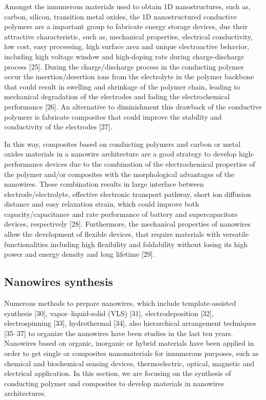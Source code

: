 Amongst the innumerous materials used to obtain 1D nanostructures, such as, carbon, silicon, transition metal oxides, the 1D nanostructured conductive polymers are a important group to fabricate energy storage devices, due their attractive characteristic, such as, mechanical properties, electrical conductivity, low cost, easy processing, high surface area and unique electroactive behavior, including high voltage window and high-doping rate during charge-discharge process [25]. During the charge/discharge process in the conducting polymer occur the insertion/desertion ions from the electrolyte in the polymer backbone that could result in swelling and shrinkage of the polymer chain, leading to mechanical degradation of the electrodes and fading the electrochemical performance [26]. An alternative to diminishment this drawback of the conductive polymers is fabricate composites that could improve the stability and conductivity of the electrodes [27].

In this way, composites based on conducting polymers and carbon or metal oxides materials in a nanowire architecture are a good strategy to develop high-performance devices due to the combination of the electrochemical properties of the polymer and/or composites with the morphological advantages of the nanowires. These combination results in large interface between electrode/electrolyte, effective electronic transport pathway, short ion diffusion distance and easy relaxation strain, which could improve both capacity/capacitance and rate performance of battery and supercapacitors devices, respectively [28]. Furthermore, the mechanical properties of nanowires allow the development of flexible devices, that require materials with versatile functionalities including high flexibility and foldability without losing its high power and energy density and long lifetime [29].

\subsection{Nanowires synthesis}

Numerous methods to prepare nanowires, which include template-assisted synthesis [30], vapor–liquid-solid (VLS) [31], electrodeposition [32], electrospinning [33], hydrothermal [34], also hierarchical arrangement techniques [35–37] to organize the nanowires have been studies in the last ten years. Nanowires based on organic, inorganic or hybrid materials have been applied in order to get single or composites nanomaterials for innumerous purposes, such as chemical and biochemical sensing devices, thermoelectric, optical, magnetic and electrical application. In this section, we are focusing on the synthesis of conducting polymer and composites to develop materials in nanowires architectures.

